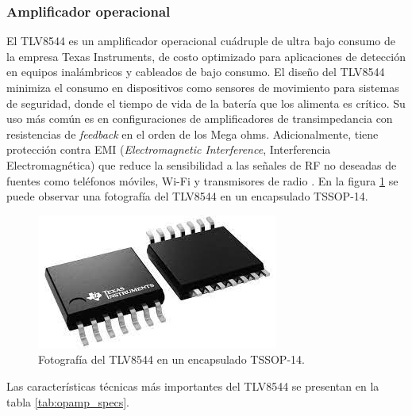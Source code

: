 \subsubsection{Amplificador operacional}
El TLV8544 es un amplificador operacional cuádruple de ultra bajo consumo de la empresa Texas Instruments, de costo optimizado para aplicaciones de detección en equipos inalámbricos y cableados de bajo consumo. El diseño del TLV8544 minimiza el consumo en dispositivos como sensores de movimiento para sistemas de seguridad, donde el tiempo de vida de la batería que los alimenta es crítico. Su uso más común es en configuraciones de amplificadores de transimpedancia con resistencias de \textit{feedback} en el orden de los Mega ohms. Adicionalmente, tiene protección contra EMI (\textit{Electromagnetic Interference}, Interferencia Electromagnética) que reduce la sensibilidad a las señales de RF no deseadas de fuentes como teléfonos móviles, Wi-Fi y transmisores de radio \cite{opamp_info}. En la figura \ref{fig:opamp_photo} se puede observar una fotografía del TLV8544 en un encapsulado TSSOP-14.

\vspace*{50 px}

\begin{figure}[h]
	\centering
	\includegraphics[scale=0.4]{./Figures/opamp_photo.jpeg}
	\caption{Fotografía del TLV8544 en un encapsulado TSSOP-14\protect\footnotemark.}
	\label{fig:opamp_photo}
\end{figure}

Las características técnicas más importantes del TLV8544 se presentan en la tabla \ref{tab:opamp_specs}.

